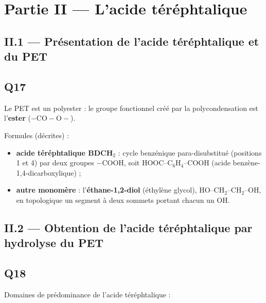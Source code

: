 \documentclass[11pt,a4paper]{article}
\providecommand{\tightlist}{\setlength{\itemsep}{0pt}\setlength{\parskip}{0pt}}
\begin{document}
\hypertarget{partie-ii-lacide-tuxe9ruxe9phtalique}{%
\section{Partie II --- L'acide téréphtalique}\label{partie-ii-lacide-tuxe9ruxe9phtalique}}

\hypertarget{ii.1-pruxe9sentation-de-lacide-tuxe9ruxe9phtalique-et-du-pet}{%
\subsection{II.1 --- Présentation de l'acide téréphtalique et du PET}\label{ii.1-pruxe9sentation-de-lacide-tuxe9ruxe9phtalique-et-du-pet}}

\hypertarget{q17}{%
\subsection{Q17}\label{q17}}

Le PET est un polyester : le groupe fonctionnel créé par la polycondensation est l'\textbf{ester} (\(-\mathrm{CO-O}-\)).

Formules (décrites) :

\begin{itemize}
\tightlist
\item
  \textbf{acide téréphtalique BDCH\(_2\)} : cycle benzénique para-disubstitué (positions 1 et 4) par deux groupes \(-\mathrm{COOH}\), soit HOOC--C\(_6\)H\(_4\)--COOH (acide benzène-\allowbreak{}1,4-\allowbreak{}dicarboxylique) ;
\item
  \textbf{autre monomère} : l'\textbf{éthane-1,2-diol} (éthylène glycol), HO--CH\(_2\)--CH\(_2\)--OH, en topologique un segment à deux sommets portant chacun un OH.
\end{itemize}

\hypertarget{ii.2-obtention-de-lacide-tuxe9ruxe9phtalique-par-hydrolyse-du-pet}{%
\subsection{II.2 --- Obtention de l'acide téréphtalique par hydrolyse du PET}\label{ii.2-obtention-de-lacide-tuxe9ruxe9phtalique-par-hydrolyse-du-pet}}

\hypertarget{q18}{%
\subsection{Q18}\label{q18}}

Domaines de prédominance de l'acide téréphtalique :
\end{document}
